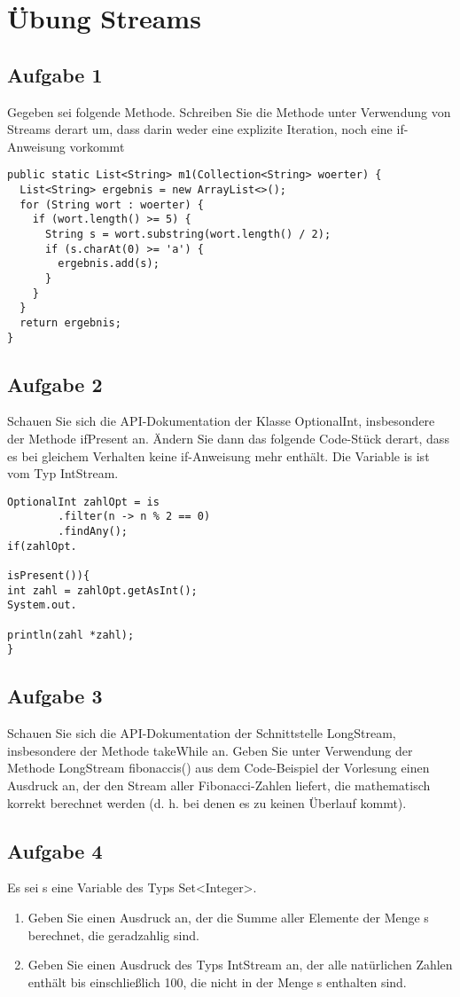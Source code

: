 \chapter{Übung Streams}

\section{Aufgabe 1}
Gegeben sei folgende Methode. Schreiben Sie die Methode unter Verwendung von
Streams derart um, dass darin weder eine explizite Iteration, noch eine
if-Anweisung vorkommt

\begin{lstlisting}
public static List<String> m1(Collection<String> woerter) {
  List<String> ergebnis = new ArrayList<>();
  for (String wort : woerter) {
    if (wort.length() >= 5) {
      String s = wort.substring(wort.length() / 2);
      if (s.charAt(0) >= 'a') {
        ergebnis.add(s);
      }
    }
  }
  return ergebnis;
}
\end{lstlisting}

\section{Aufgabe 2}
Schauen Sie sich die API-Dokumentation der Klasse OptionalInt, insbesondere der
Methode ifPresent an. Ändern Sie dann das folgende Code-Stück derart, dass es
bei gleichem Verhalten keine if-Anweisung mehr enthält. Die Variable is ist vom
Typ IntStream.

\begin{lstlisting}
OptionalInt zahlOpt = is
        .filter(n -> n % 2 == 0)
        .findAny();
if(zahlOpt.

isPresent()){
int zahl = zahlOpt.getAsInt();
System.out.

println(zahl *zahl);
}
\end{lstlisting}

\section{Aufgabe 3}
Schauen Sie sich die API-Dokumentation der Schnittstelle LongStream,
insbesondere der Methode takeWhile an. Geben Sie unter Verwendung der Methode
LongStream fibonaccis() aus dem Code-Beispiel der Vorlesung einen Ausdruck an,
der den Stream aller Fibonacci-Zahlen liefert, die mathematisch korrekt
berechnet werden (d. h. bei denen es zu keinen Überlauf kommt).

\section{Aufgabe 4}
Es sei s eine Variable des Typs Set<Integer>.
\begin{enumerate}
    \item Geben Sie einen Ausdruck an, der die Summe aller Elemente der Menge s
          berechnet, die geradzahlig sind.
    \item Geben Sie einen Ausdruck des Typs IntStream an, der alle natürlichen Zahlen
          enthält bis einschließlich 100, die nicht in der Menge s enthalten sind.
\end{enumerate}

